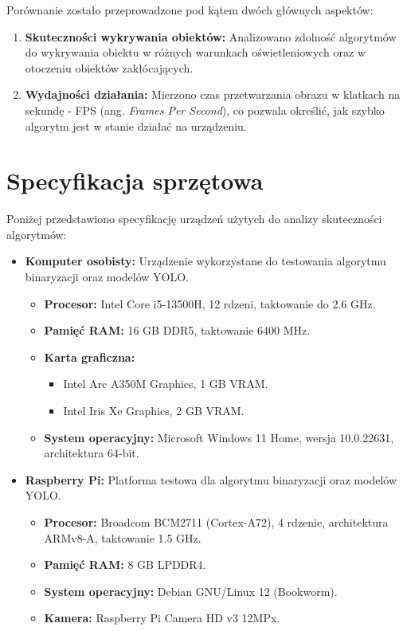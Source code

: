 \documentclass[a4paper,twoside,12pt]{book}
\begin{document}
Porównanie zostało przeprowadzone pod kątem dwóch głównych aspektów:
\begin{enumerate}
    \item \textbf{Skuteczności wykrywania obiektów:} Analizowano zdolność algorytmów do wykrywania obiektu w różnych warunkach oświetleniowych oraz w otoczeniu obiektów zakłócających.
    \item \textbf{Wydajności działania:} Mierzono czas przetwarzania obrazu w klatkach na sekundę - FPS (ang. \textit{Frames Per Second}), co pozwala określić, jak szybko algorytm jest w stanie działać na urządzeniu.
\end{enumerate}

\newpage

\section{Specyfikacja sprzętowa}
Poniżej przedstawiono specyfikację urządzeń użytych do analizy skuteczności algorytmów:
\begin{itemize}
    \item \textbf{Komputer osobisty:} Urządzenie wykorzystane do testowania algorytmu binaryzacji oraz modelów YOLO.
    \begin{itemize}
        \item \textbf{Procesor:} Intel Core i5-13500H, 12 rdzeni, taktowanie do 2.6 GHz.
        \item \textbf{Pamięć RAM:} 16 GB DDR5, taktowanie 6400 MHz.
        \item \textbf{Karta graficzna:} 
        \begin{itemize}
            \item Intel Arc A350M Graphics, 1 GB VRAM.
            \item Intel Iris Xe Graphics, 2 GB VRAM.
        \end{itemize}
        \item \textbf{System operacyjny:} Microsoft Windows 11 Home, wersja 10.0.22631, architektura 64-bit.
    \end{itemize}
    \item \textbf{Raspberry Pi:} Platforma testowa dla algorytmu binaryzacji oraz modelów YOLO.
    \begin{itemize}
        \item \textbf{Procesor:} Broadcom BCM2711 (Cortex-A72), 4 rdzenie, architektura ARMv8-A, taktowanie 1.5 GHz.
        \item \textbf{Pamięć RAM:} 8 GB LPDDR4.
        \item \textbf{System operacyjny:} Debian GNU/Linux 12 (Bookworm).
        \item \textbf{Kamera:} Raspberry Pi Camera HD v3 12MPx.
    \end{itemize}    
\end{itemize}
\end{document}
